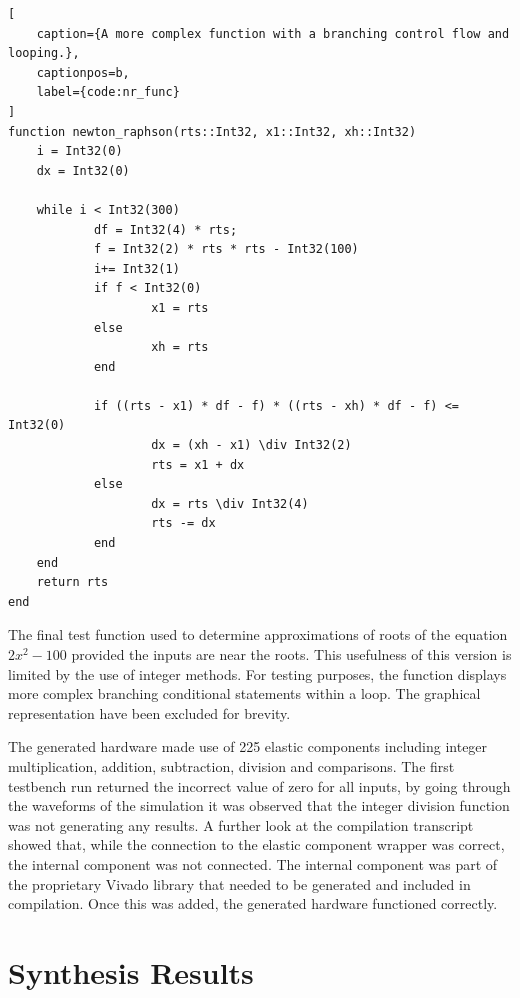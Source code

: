 \begin{lstlisting}[
    caption={A more complex function with a branching control flow and looping.},
    captionpos=b, 
    label={code:nr_func}
]
function newton_raphson(rts::Int32, x1::Int32, xh::Int32)
    i = Int32(0)
    dx = Int32(0)

    while i < Int32(300)
            df = Int32(4) * rts;
            f = Int32(2) * rts * rts - Int32(100)
            i+= Int32(1)
            if f < Int32(0)
                    x1 = rts
            else
                    xh = rts
            end

            if ((rts - x1) * df - f) * ((rts - xh) * df - f) <= Int32(0)
                    dx = (xh - x1) \div Int32(2)
                    rts = x1 + dx
            else
                    dx = rts \div Int32(4)
                    rts -= dx
            end
    end
    return rts
end
\end{lstlisting}

The final test function used to determine approximations of roots of the equation $2x^2 - 100$ provided the inputs are near the roots. This usefulness of this version is limited by the use of integer methods. For testing purposes, the function displays more complex branching conditional statements within a loop. The graphical representation have been excluded for brevity. 

The generated hardware made use of 225 elastic components including integer multiplication, addition, subtraction, division and comparisons. The first testbench run returned the incorrect value of zero for all inputs, by going through the waveforms of the simulation it was observed that the integer division function was not generating any results. A further look at the compilation transcript showed that, while the connection to the elastic component wrapper was correct, the internal component was not connected. The internal component was part of the proprietary Vivado library that needed to be generated and included in compilation. Once this was added, the generated hardware functioned correctly.

\pagebreak

\section{Synthesis Results}

\begingroup
\renewcommand{\arraystretch}{1.5} %

